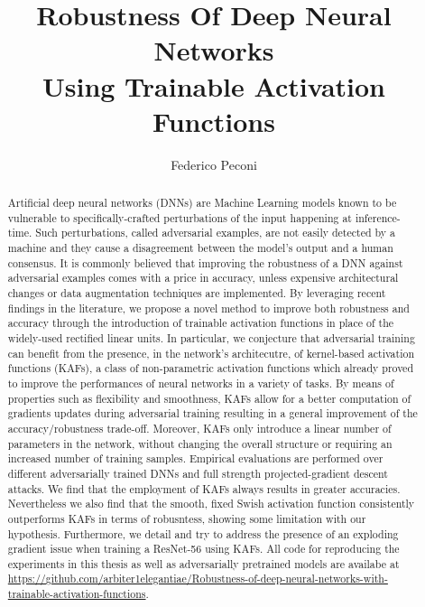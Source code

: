\documentclass[LaM,binding=0.6cm]{./packages/sapthesis/sapthesis}
\title{Robustness Of Deep Neural Networks \\Using Trainable Activation Functions}
\author{Federico Peconi}
\begin{document}
\frontmatter

\maketitle
\dedication{To my parents}

\begin{abstract}
Artificial deep neural networks (DNNs) are Machine Learning models known to be vulnerable to specifically-crafted perturbations of the input happening at inference-time.
Such perturbations, called adversarial examples, are not easily detected by a machine and they cause a disagreement between the model's output and a human consensus. 
It is commonly believed that improving the robustness of a DNN against adversarial examples comes with a price in accuracy, unless expensive architectural changes or data augmentation techniques 
are implemented. By leveraging recent findings in the literature, we propose a novel method to improve both robustness and accuracy through the introduction of trainable activation
functions in place of the widely-used rectified linear units. In particular, we conjecture that adversarial training can benefit from the presence, in the network's architecutre, of 
kernel-based activation functions (KAFs), a class of non-parametric activation functions which already proved to improve the performances of neural networks in a variety of tasks.
By means of properties such as flexibility and smoothness, KAFs allow for a better computation of gradients updates during adversarial training resulting in a general improvement of the 
accuracy/robustness trade-off. Moreover, KAFs only introduce a linear number of parameters in the network, without changing the overall structure or requiring an increased number of training 
samples. Empirical evaluations are performed over different adversarially trained DNNs and full strength projected-gradient descent attacks. We find that the employment of KAFs always 
results in greater accuracies. Nevertheless we also find that the smooth, fixed Swish activation function consistently outperforms KAFs in terms of robusntess, showing some limitation with 
our hypothesis. Furthermore, we detail and try to address the presence of an exploding gradient issue when training a ResNet-56 using KAFs.
All code for reproducing the experiments in this thesis as well as adversarially pretrained models are availabe at \url{https://github.com/arbiter1elegantiae/Robustness-of-deep-neural-networks-with-trainable-activation-functions}.
\end{abstract}
\end{document}
